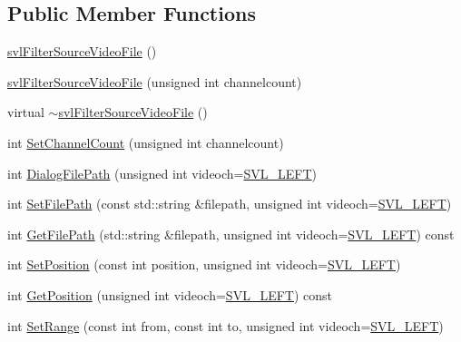 \subsection*{Public Member Functions}
\begin{DoxyCompactItemize}
\item 
\hyperlink{classsvl_filter_source_video_file_a4ae5b43e23aeca2412c8e779bddd35c6}{svl\+Filter\+Source\+Video\+File} ()
\item 
\hyperlink{classsvl_filter_source_video_file_ad9220ec0d2646113193398e16c7f0811}{svl\+Filter\+Source\+Video\+File} (unsigned int channelcount)
\item 
virtual \hyperlink{classsvl_filter_source_video_file_a3a1d53fa0e67675d1bbf6d85f1603602}{$\sim$svl\+Filter\+Source\+Video\+File} ()
\item 
int \hyperlink{classsvl_filter_source_video_file_a1dbbaea65873ac946978835fe99825f6}{Set\+Channel\+Count} (unsigned int channelcount)
\item 
int \hyperlink{classsvl_filter_source_video_file_ad333c5d32e7af1a6cdb77e9fde5dbd7d}{Dialog\+File\+Path} (unsigned int videoch=\hyperlink{svl_definitions_8h_ab9fec7615f19c8df2919eebcab0b187f}{S\+V\+L\+\_\+\+L\+E\+F\+T})
\item 
int \hyperlink{classsvl_filter_source_video_file_a43013197d2bcd8e9168fc2449a647e1e}{Set\+File\+Path} (const std\+::string \&filepath, unsigned int videoch=\hyperlink{svl_definitions_8h_ab9fec7615f19c8df2919eebcab0b187f}{S\+V\+L\+\_\+\+L\+E\+F\+T})
\item 
int \hyperlink{classsvl_filter_source_video_file_a34f297adfdfa4bbb335078e4941b7a52}{Get\+File\+Path} (std\+::string \&filepath, unsigned int videoch=\hyperlink{svl_definitions_8h_ab9fec7615f19c8df2919eebcab0b187f}{S\+V\+L\+\_\+\+L\+E\+F\+T}) const 
\item 
int \hyperlink{classsvl_filter_source_video_file_aa0036ad697898a0ec132843293562a20}{Set\+Position} (const int position, unsigned int videoch=\hyperlink{svl_definitions_8h_ab9fec7615f19c8df2919eebcab0b187f}{S\+V\+L\+\_\+\+L\+E\+F\+T})
\item 
int \hyperlink{classsvl_filter_source_video_file_a685667f2173c9a6096f7ab80dfdb9a77}{Get\+Position} (unsigned int videoch=\hyperlink{svl_definitions_8h_ab9fec7615f19c8df2919eebcab0b187f}{S\+V\+L\+\_\+\+L\+E\+F\+T}) const 
\item 
int \hyperlink{classsvl_filter_source_video_file_a9503b15a4f762f2a6a8da06c3bf3f281}{Set\+Range} (const int from, const int to, unsigned int videoch=\hyperlink{svl_definitions_8h_ab9fec7615f19c8df2919eebcab0b187f}{S\+V\+L\+\_\+\+L\+E\+F\+T})

\end{DoxyCompactItemize}
